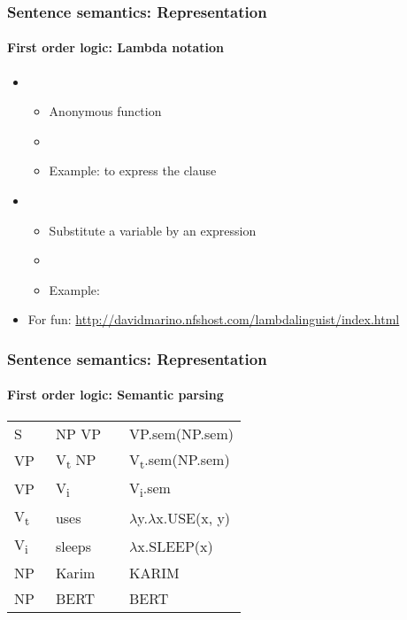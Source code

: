 \documentclass[xcolor=table]{beamer}
\begin{document}
\begin{frame}
	\frametitle{Sentence semantics: Representation}
	\framesubtitle{First order logic: Lambda notation}
	
	\begin{itemize}
		\item {}
		\begin{itemize}
			\item Anonymous function
			\item {}
			\item Example:  to express the clause 
		\end{itemize}
	
		\item {}
		\begin{itemize}
			\item Substitute a variable by an expression
			\item \keyword{$ \phi (\psi) $}
			\item Example: 
		\end{itemize}
		
		\item For fun: \url{http://davidmarino.nfshost.com/lambdalinguist/index.html}
	\end{itemize}
	
\end{frame}

\begin{frame}
	\frametitle{Sentence semantics: Representation}
	\framesubtitle{First order logic: Semantic parsing}

\begin{center}
	\small\bfseries
	\begin{tabular}{llll}
		\hline\hline
		S  & \textrightarrow\ NP VP && VP.sem(NP.sem) \\
		VP & \textrightarrow\ V\textsubscript{t} NP && V\textsubscript{t}.sem(NP.sem)\\
		VP & \textrightarrow\ V\textsubscript{i} && V\textsubscript{i}.sem \\
		V\textsubscript{t}  & \textrightarrow\ uses && $ \lambda $y.$ \lambda $x.USE(x, y) \\
		V\textsubscript{i}  & \textrightarrow\ sleeps && $ \lambda $x.SLEEP(x) \\
		NP  & \textrightarrow\  Karim && KARIM \\
		NP  & \textrightarrow\  BERT && BERT \\
		\hline\hline
		\end{tabular}
	
\end{center}
	

\end{frame}
\end{document}
